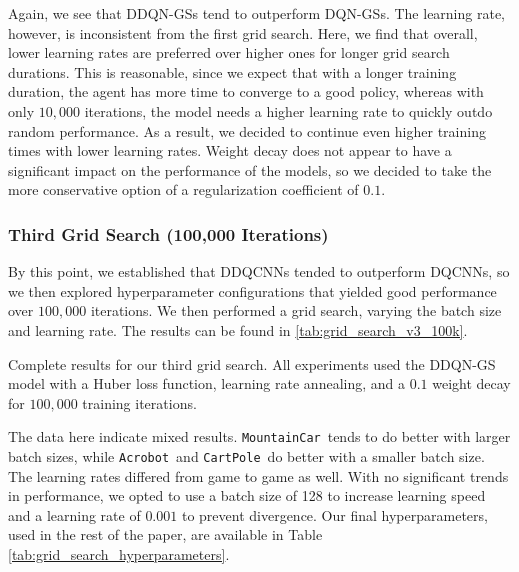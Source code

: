 \documentclass[11pt]{article}
\newcommand{\cp}{\texttt{CartPole}}
\newcommand{\ab}{\texttt{Acrobot}}
\newcommand{\mc}{\texttt{MountainCar}}
\begin{document}
Again, we see that DDQN-GSs tend to outperform DQN-GSs. The learning rate, however, is inconsistent from the first grid search. Here, we find that overall, lower learning rates are preferred over higher ones for longer grid search durations. This is reasonable, since we expect that with a longer training duration, the agent has more time to converge to a good policy, whereas with only $10,000$ iterations, the model needs a higher learning rate to quickly outdo random performance. As a result, we decided to continue even higher training times with lower learning rates. Weight decay does not appear to have a significant impact on the performance of the models, so we decided to take the more conservative option of a regularization coefficient of $0.1$.

\subsubsection{Third Grid Search (100,000 Iterations)}

By this point, we established that DDQCNNs tended to outperform DQCNNs, so we then explored hyperparameter configurations that yielded good performance over $100,000$ iterations. We then performed a grid search, varying the batch size and learning rate. The results can be found in \ref{tab:grid_search_v3_100k}.

\begin{table}[!htbp]
  \footnotesize
  \centering
  
  
  \caption{Complete results for our third grid search. All experiments used the DDQN-GS model with a Huber loss function, learning rate annealing, and a $0.1$ weight decay for $100,000$ training iterations.}
  \label{tab:grid_search_v3_100k}
\end{table}

The data here indicate mixed results. \mc~tends to do better with larger batch sizes, while \ab~and \cp~do better with a smaller batch size. The learning rates differed from game to game as well. With no significant trends in performance, we opted to use a batch size of 128 to increase learning speed and a learning rate of $0.001$ to prevent divergence. Our final hyperparameters, used in the rest of the paper, are available in Table \ref{tab:grid_search_hyperparameters}.
\end{document}
